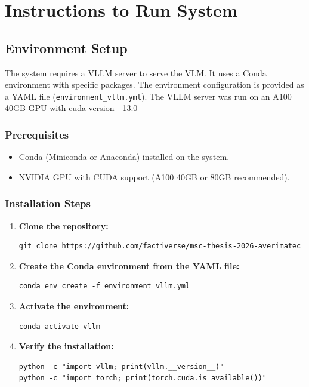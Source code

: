 \chapter{Instructions to Run System}
\label{apx:instructions}

\section{Environment Setup}

The system requires a VLLM server to serve the VLM. It uses a Conda environment with specific packages. The environment configuration is provided as a YAML file (\texttt{environment\_vllm.yml}).
The VLLM server was run on an A100 40GB GPU with cuda version - 13.0

\subsection{Prerequisites}

\begin{itemize}
    \item Conda (Miniconda or Anaconda) installed on the system.
    \item NVIDIA GPU with CUDA support (A100 40GB or 80GB recommended).
\end{itemize}

\subsection{Installation Steps}

\begin{enumerate}
    \item \textbf{Clone the repository:}
\begin{verbatim}
git clone https://github.com/factiverse/msc-thesis-2026-averimatec
\end{verbatim}

    \item \textbf{Create the Conda environment from the YAML file:}
\begin{verbatim}
conda env create -f environment_vllm.yml
\end{verbatim}

    \item \textbf{Activate the environment:}
\begin{verbatim}
conda activate vllm
\end{verbatim}

    \item \textbf{Verify the installation:}
\begin{verbatim}
python -c "import vllm; print(vllm.__version__)"
python -c "import torch; print(torch.cuda.is_available())"
\end{verbatim}
\end{enumerate}


